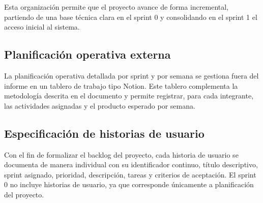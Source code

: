 Esta organización permite que el proyecto avance de forma incremental, partiendo de una base técnica clara en el sprint 0 y consolidando en el sprint 1 el acceso inicial al sistema.

\subsection{Planificación operativa externa}

La planificación operativa detallada por sprint y por semana se gestiona fuera del informe en un tablero de trabajo tipo Notion. Este tablero complementa la metodología descrita en el documento y permite registrar, para cada integrante, las actividades asignadas y el producto esperado por semana.

\subsection{Especificación de historias de usuario}

Con el fin de formalizar el backlog del proyecto, cada historia de usuario se documenta de manera individual con su identificador continuo, título descriptivo, sprint asignado, prioridad, descripción, tareas y criterios de aceptación. El sprint 0 no incluye historias de usuario, ya que corresponde únicamente a planificación del proyecto.


